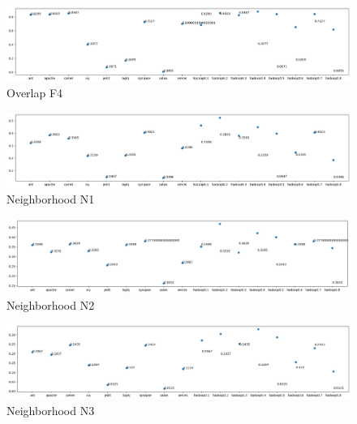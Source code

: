 \begin{figure}[h!]
    \centering
    \includegraphics[width=\textwidth]{figures/overlap-F4.png}
    \caption{Overlap F4}
    \label{fig:overlap-f4-big}
\end{figure}


\begin{figure}[h!]
    \centering
    \includegraphics[width=\textwidth]{figures/neighborhood-N1.png}
    \caption{Neighborhood N1}
    \label{fig:neighborhood-n1-big}
\end{figure}

\begin{figure}[h!]
    \includegraphics[width=\textwidth]{figures/neighborhood-N2.png}
    \caption{Neighborhood N2}
    \label{fig:neighborhood-n2-big}
\end{figure}

\begin{figure}[h!]
    \centering
    \includegraphics[width=\textwidth]{figures/neighborhood-N3.png}
    \caption{Neighborhood N3}
    \label{fig:neighborhood-n3-big}
\end{figure}

